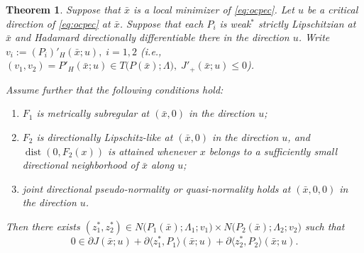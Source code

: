 \documentclass[12pt,twoside,reqno]{amsart}
\newtheorem{theorem}{Theorem}[section]
\theoremstyle{definition}
\numberwithin{equation}{section}
\begin{document}
\begin{theorem}\label{thm:optimality_condition_ocpec}
Suppose that \(\bar{x}\) is a local minimizer of
\eqref{eq:ocpec}. Let \(u\) be a critical direction of \eqref{eq:ocpec} at \(\bar{x}\).
Suppose that each \(P_i\) is weak\(^*\) strictly Lipschitzian at \(\bar{x}\) and Hadamard directionally differentiable there in the direction \(u\). Write $v_i:=(P_i)'_H(\bar{x};u),\; i=1,2$ (i.e., $(v_1,v_2)=P'_H(\bar{x};u)
    \in T\bigl(P(\bar{x});\Lambda\bigr),\;J'_+(\bar{x};u)\leq0$). 

Assume further that the following conditions hold:

\begin{enumerate}
    \item[(i)]
    \(F_1\) is metrically subregular at
    \((\bar{x},0)\) in the direction \(u\);

    \item[(ii)]
    \(F_2\) is directionally Lipschitz-like at
    \((\bar{x},0)\) in the direction \(u\), and
    \(\operatorname{dist}(0,F_2(x))\) is attained whenever \(x\) belongs to a sufficiently small directional neighborhood
    of \(\bar{x}\) along \(u\);

    \item[(iii)]
    joint directional pseudo-normality or quasi-normality holds at
    \((\bar{x},0,0)\) in the direction \(u\).
\end{enumerate}

Then there exists
$(z_1^*,z_2^*)\in N\bigl(P_1(\bar{x});\Lambda_1;v_1\bigr)
    \times N\bigl(P_2(\bar{x});\Lambda_2;v_2\bigr)$ such that
\begin{equation}\label{eq:joint_optimality_formula}
    0\in
    \partial J(\bar{x};u)
    +\partial\langle z_1^*,P_1\rangle(\bar{x};u)
    +\partial\langle z_2^*,P_2\rangle(\bar{x};u).
\end{equation}
\end{theorem}
\end{document}
